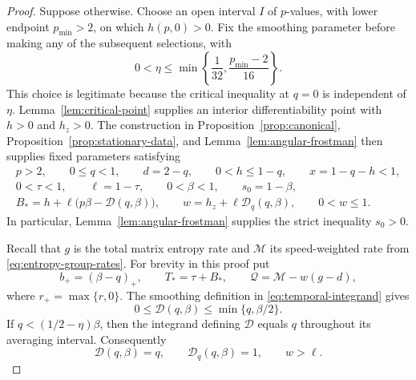 \begin{proof}
Suppose otherwise.  Choose an open interval \(I\) of \(p\)-values, with
lower endpoint \(p_{\min}>2\), on which \(h(p,0)>0\).  Fix the smoothing
parameter before making any of the subsequent selections, with
\begin{equation}
  0<\eta\le
  \min\left\{\frac1{32},\frac{p_{\min}-2}{16}\right\}.
  \label{eq:closure-eta}
\end{equation}
This choice is legitimate because the critical inequality at \(q=0\) is
independent of \(\eta\).  Lemma~\ref{lem:critical-point} supplies an interior
differentiability point with \(h>0\) and \(h_z>0\).  The construction in
Proposition~\ref{prop:canonical}, Proposition~\ref{prop:stationary-data}, and
Lemma~\ref{lem:angular-frostman} then supplies fixed parameters satisfying
\begin{gather}
  p>2,\qquad 0\le q<1,\qquad d=2-q,\qquad
  0<h\le1-q,\qquad x=1-q-h<1, \label{eq:closure-parameters-a}\\
  0<\tau<1,\qquad \ell=1-\tau,\qquad
  0<\beta<1,\qquad s_0=1-\beta, \label{eq:closure-parameters-b}\\
  B_*=h+\ell\bigl(p\beta-\mathcal D(q,\beta)\bigr),\qquad
  w=h_z+\ell\mathcal D_q(q,\beta),\qquad 0<w\le1.
  \label{eq:closure-parameters-c}
\end{gather}
In particular, Lemma~\ref{lem:angular-frostman} supplies the strict
inequality \(s_0>0\).

Recall that $g$ is the total matrix entropy rate and $\mathcal M$ its
speed-weighted rate from \eqref{eq:entropy-group-rates}.
For brevity in this proof put
\begin{equation}
  b_+=(\beta-q)_+,\qquad T_*=\tau+B_*,\qquad
  \mathcal Q=\mathcal M-w(g-d),
  \label{eq:closure-demand-notation}
\end{equation}
where \(r_+=\max\{r,0\}\).  The smoothing definition in \eqref{eq:temporal-integrand} gives
\begin{equation}
  0\le\mathcal D(q,\beta)\le\min\{q,\beta/2\}.
  \label{eq:closure-cost-bound}
\end{equation}
If \(q<(1/2-\eta)\beta\), then the integrand defining \(\mathcal D\)
equals \(q\) throughout its averaging interval.  Consequently
\begin{equation}
  \mathcal D(q,\beta)=q,\qquad
  \mathcal D_q(q,\beta)=1,\qquad w>\ell.
  \label{eq:closure-low-q}
\end{equation}


\end{proof}
